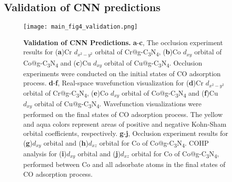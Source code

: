 
\subsection{Validation of CNN predictions}

\begin{figure}[htbp]
    \centering
    \texttt{[image: main\_fig4\_validation.png]}
    \caption{\textbf{Validation of CNN Predictions.}
    \textbf{a}-\textbf{c}, The occlusion experiment results for (\textbf{a})Cr
    $d_{x^2-y^2}$ orbital of Cr@g-C\textsubscript{3}N\textsubscript{4},
    (\textbf{b})Co $d_{xy}$ orbital of Co@g-C\textsubscript{3}N\textsubscript{4} and
    (\textbf{c})Cu $d_{xy}$ orbital of Cu@g-C\textsubscript{3}N\textsubscript{4}.
    Occlusion experiments were conducted on the initial states of CO adsorption process.
    \textbf{d}-\textbf{f}, Real-space wavefunction visualization for (\textbf{d})Cr
    $d_{x^2-y^2}$ orbital of Cr@g-C\textsubscript{3}N\textsubscript{4}, (\textbf{e})Co
    $d_{xy}$ orbital of Co@g-C\textsubscript{3}N\textsubscript{4} and (\textbf{f})Cu
    $d_{xy}$ orbital of Cu@g-C\textsubscript{3}N\textsubscript{4}.
    Wavefunction visualizations were performed on the final states of CO adsorption process.
    The yellow and aqua colors represent areas of positive and negative
    Kohn-Sham orbital coefficients, respectively.
    \textbf{g}-\textbf{j}, Occlusion experiment results for (\textbf{g})$d_{xy}$ orbital
    and (\textbf{h})$d_{xz}$ orbital for Co of Co@g-C\textsubscript{3}N\textsubscript{4}.
    COHP analysis for (\textbf{i})$d_{xy}$ orbital and (\textbf{j})$d_{xz}$ orbital for
     Co of Co@g-C\textsubscript{3}N\textsubscript{4}, performed between Co and
     all adsorbate atoms in the final states of CO adsorption process.}
    \label{main_fig4:validation}
\end{figure}

